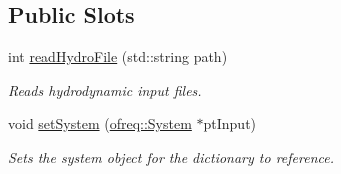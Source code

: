 \subsection*{Public Slots}
\begin{DoxyCompactItemize}
\item 
int \hyperlink{classosea_1_1_file_reader_aafe1acb27e25c2774c04c21a808748a4}{read\-Hydro\-File} (std\-::string path)
\begin{DoxyCompactList}\small\item\em Reads hydrodynamic input files. \end{DoxyCompactList}\item 
void \hyperlink{classosea_1_1_file_reader_a54b42892f8c4de66ad1f7bfd1e8e0a27}{set\-System} (\hyperlink{classosea_1_1ofreq_1_1_system}{ofreq\-::\-System} $\ast$pt\-Input)
\begin{DoxyCompactList}\small\item\em Sets the system object for the dictionary to reference. \end{DoxyCompactList}\end{DoxyCompactItemize}
